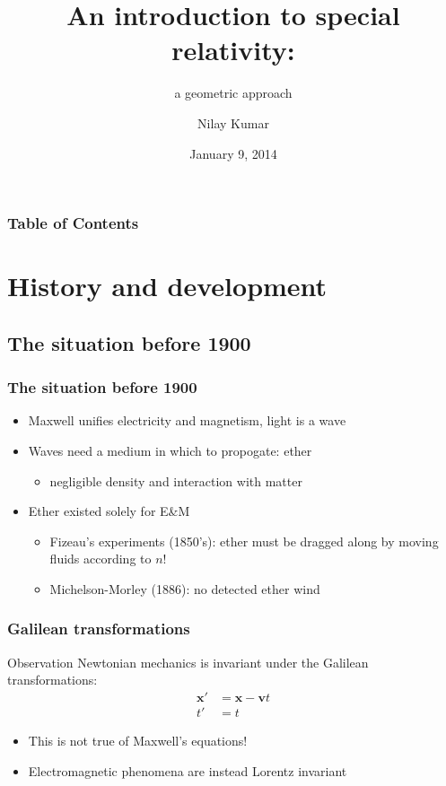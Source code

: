 \documentclass{beamer}
\begin{document}
\title{An introduction to special relativity:}
\subtitle{a geometric approach}
\author{Nilay Kumar}
\date{January 9, 2014}
\frame{\titlepage}

\begin{frame}
    \frametitle{Table of Contents}
    \tableofcontents
\end{frame}


\section{History and development}
\subsection{The situation before 1900}

\begin{frame}
    \frametitle{The situation before 1900}
    \begin{itemize}
        \item Maxwell unifies electricity and magnetism, light is a wave
        \item Waves need a medium in which to propogate: ether
            \begin{itemize}
                \item negligible density and interaction with matter
            \end{itemize}
        \item Ether existed solely for E\&M
            \begin{itemize}
                \item Fizeau's experiments (1850's): ether must be dragged along by moving fluids according to $n$!
                \item Michelson-Morley (1886): no detected ether wind
            \end{itemize}
    \end{itemize}
\end{frame}

\begin{frame}
    \frametitle{Galilean transformations}
    \begin{block}{Observation}
        Newtonian mechanics is invariant under the Galilean transformations:
        \begin{align*}
            \mathbf{x'} &= \mathbf{x}-\mathbf{v} t\\
            t' &= t
        \end{align*}
    \end{block}
    \begin{itemize}
        \item This is not true of Maxwell's equations!
        \item Electromagnetic phenomena are instead Lorentz invariant
    \end{itemize}
\end{frame}
\end{document}
